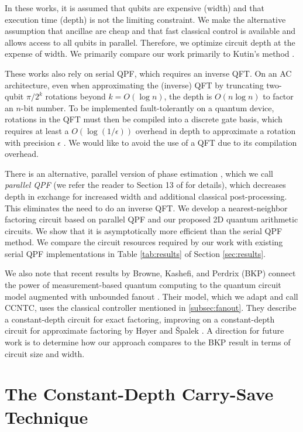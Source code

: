 \documentclass[twoside]{article}
\begin{document}
In these works, it is assumed that qubits are expensive (width) and that
execution time (depth) is not the limiting constraint.
We make the alternative assumption that ancillae are cheap and that fast classical control
is available and allows access to all qubits in parallel. 
Therefore, we optimize circuit depth at the expense of width.
We primarily compare our work primarily to Kutin's method \cite{Kutin2006}.

These works also rely on serial QPF, which requires an inverse QFT.
On an AC architecture, even when approximating the (inverse) QFT by truncating two-qubit
$\pi/2^k$ rotations beyond $k = O(\log n)$, 
the depth is $O(n \log n)$ to factor an $n$-bit number.
To be implemented fault-tolerantly on a quantum device, rotations in the QFT must then be compiled into a discrete gate basis, 
which requires at least a $O(\log(1/\epsilon))$ overhead in depth to approximate a rotation with precision $\epsilon$ \cite{Harrow02, Kitaev2002}.
We would like to avoid the use of a QFT due to its compilation overhead.

There is an alternative, parallel version of phase estimation \cite{Kitaev2002}, which we call \emph{parallel QPF} (we refer the reader to Section 13 of \cite{Kitaev2002} for details), which decreases depth in exchange
for increased width and additional classical post-processing.
This eliminates the need to do an inverse QFT.
We develop a nearest-neighbor factoring circuit based on parallel QPF and our proposed 2D quantum arithmetic circuits.
We show that it is asymptotically more efficient than the serial QPF method. 
We compare the circuit resources required by our work with existing serial QPF implementations in Table
\ref{tab:results} of Section \ref{sec:results}.

We also note that recent results by Browne, Kashefi, and Perdrix (BKP) connect the power of
measurement-based quantum computing to the quantum circuit model augmented with
unbounded fanout \cite{Browne2009}. Their model, which we adapt and call
\textsc{CCNTC}, uses the classical controller mentioned in \ref{subsec:fanout}.
They describe a constant-depth circuit for
exact factoring, improving on a constant-depth circuit for approximate factoring
by H{\o}yer and {\v S}palek \cite{Hoyer2002}.
A direction for future work is to determine how our approach compares to the
BKP result in terms of circuit size and width.


%
\section{The Constant-Depth Carry-Save Technique}
\label{sec:csa}
\end{document}
